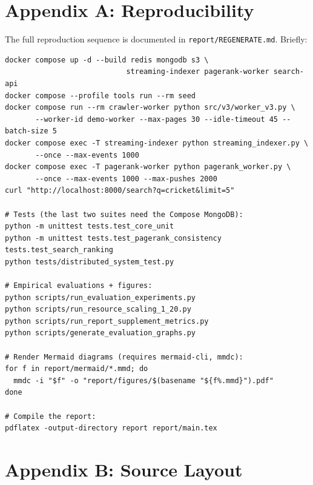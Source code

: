 \documentclass[11pt,a4paper]{article}
\newcommand{\code}[1]{\texttt{#1}}
\begin{document}
\appendix

\section{Appendix A: Reproducibility}

The full reproduction sequence is documented in \code{report/REGENERATE.md}. Briefly:

\begin{verbatim}
docker compose up -d --build redis mongodb s3 \
                            streaming-indexer pagerank-worker search-api
docker compose --profile tools run --rm seed
docker compose run --rm crawler-worker python src/v3/worker_v3.py \
       --worker-id demo-worker --max-pages 30 --idle-timeout 45 --batch-size 5
docker compose exec -T streaming-indexer python streaming_indexer.py \
       --once --max-events 1000
docker compose exec -T pagerank-worker python pagerank_worker.py \
       --once --max-events 1000 --max-pushes 2000
curl "http://localhost:8000/search?q=cricket&limit=5"

# Tests (the last two suites need the Compose MongoDB):
python -m unittest tests.test_core_unit
python -m unittest tests.test_pagerank_consistency tests.test_search_ranking
python tests/distributed_system_test.py

# Empirical evaluations + figures:
python scripts/run_evaluation_experiments.py
python scripts/run_resource_scaling_1_20.py
python scripts/run_report_supplement_metrics.py
python scripts/generate_evaluation_graphs.py

# Render Mermaid diagrams (requires mermaid-cli, mmdc):
for f in report/mermaid/*.mmd; do
  mmdc -i "$f" -o "report/figures/$(basename "${f%.mmd}").pdf"
done

# Compile the report:
pdflatex -output-directory report report/main.tex
\end{verbatim}

\section{Appendix B: Source Layout}
\end{document}
